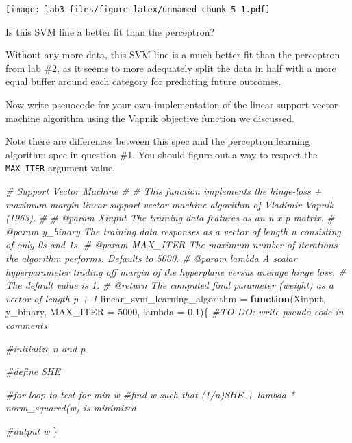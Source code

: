 \documentclass[
]{article}
\newenvironment{Shaded}{\begin{snugshade}}{\end{snugshade}}
\newcommand{\AttributeTok}[1]{\textcolor[rgb]{0.77,0.63,0.00}{#1}}
\newcommand{\CommentTok}[1]{\textcolor[rgb]{0.56,0.35,0.01}{\textit{#1}}}
\newcommand{\ControlFlowTok}[1]{\textcolor[rgb]{0.13,0.29,0.53}{\textbf{#1}}}
\newcommand{\DecValTok}[1]{\textcolor[rgb]{0.00,0.00,0.81}{#1}}
\newcommand{\FloatTok}[1]{\textcolor[rgb]{0.00,0.00,0.81}{#1}}
\newcommand{\NormalTok}[1]{#1}
\newcommand{\OtherTok}[1]{\textcolor[rgb]{0.56,0.35,0.01}{#1}}
\begin{document}
\texttt{[image: lab3\_files/figure-latex/unnamed-chunk-5-1.pdf]}

Is this SVM line a better fit than the perceptron?

Without any more data, this SVM line is a much better fit than the
perceptron from lab \#2, as it seems to more adequately split the data
in half with a more equal buffer around each category for predicting
future outcomes.

Now write pseuocode for your own implementation of the linear support
vector machine algorithm using the Vapnik objective function we
discussed.

Note there are differences between this spec and the perceptron learning
algorithm spec in question \#1. You should figure out a way to respect
the \texttt{MAX\_ITER} argument value.

\begin{Shaded}
\begin{Highlighting}[]
\CommentTok{\#\textquotesingle{} Support Vector Machine }
\CommentTok{\#}
\CommentTok{\#\textquotesingle{} This function implements the hinge{-}loss + maximum margin linear support vector machine algorithm of Vladimir Vapnik (1963).}
\CommentTok{\#\textquotesingle{}}
\CommentTok{\#\textquotesingle{} @param Xinput      The training data features as an n x p matrix.}
\CommentTok{\#\textquotesingle{} @param y\_binary    The training data responses as a vector of length n consisting of only 0\textquotesingle{}s and 1\textquotesingle{}s.}
\CommentTok{\#\textquotesingle{} @param MAX\_ITER    The maximum number of iterations the algorithm performs. Defaults to 5000.}
\CommentTok{\#\textquotesingle{} @param lambda      A scalar hyperparameter trading off margin of the hyperplane versus average hinge loss.}
\CommentTok{\#\textquotesingle{}                    The default value is 1.}
\CommentTok{\#\textquotesingle{} @return            The computed final parameter (weight) as a vector of length p + 1}
\NormalTok{linear\_svm\_learning\_algorithm }\OtherTok{=} \ControlFlowTok{function}\NormalTok{(Xinput, y\_binary, }\AttributeTok{MAX\_ITER =} \DecValTok{5000}\NormalTok{, }\AttributeTok{lambda =} \FloatTok{0.1}\NormalTok{)\{}
  \CommentTok{\#TO{-}DO: write pseudo code in comments}
  
  
  \CommentTok{\#initialize n and p}
  
  \CommentTok{\#define SHE}
  
  \CommentTok{\#for loop to test for min w}
      \CommentTok{\#find w such that (1/n)SHE + lambda * norm\_squared(w) is minimized}
  
  \CommentTok{\#output w}
\NormalTok{\}}
\end{Highlighting}
\end{Shaded}
\end{document}
